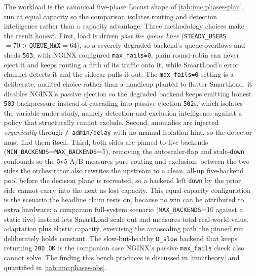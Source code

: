 The workload is the canonical five-phase Locust shape of \cref{tab:imc:phases-plan},
run at equal capacity so the comparison isolates routing and detection intelligence
rather than a capacity advantage. Three methodology choices make the result honest.
First, load is driven \emph{past the queue knee} (\texttt{STEADY\_USERS}$=70 >
\texttt{QUEUE\_MAX}=64$), so a severely degraded backend's queue overflows and sheds
\texttt{503}; with NGINX configured \texttt{max\_fails=0}, plain round-robin can never
eject it and keeps routing a fifth of its traffic onto it, while SmartLoad's error
channel detects it and the sidecar pulls it out. The \texttt{max\_fails=0} setting is a
deliberate, audited choice rather than a handicap planted to flatter SmartLoad: it
disables NGINX's passive ejection so the degraded backend keeps emitting honest
\texttt{503} backpressure instead of cascading into passive-ejection \texttt{502}s, which
isolates the variable under study, namely detection-and-exclusion intelligence against a
policy that structurally cannot exclude. Second, anomalies are injected
\emph{organically} through \texttt{/\_admin/delay} with no manual isolation hint, so the
detector must find them itself. Third, both sides are pinned to five backends
(\texttt{MIN\_BACKENDS}=\texttt{MAX\_BACKENDS}=5), removing the autoscaler-flap and
stale-\texttt{down} confounds so the 5v5 A/B measures pure routing and exclusion; between
the two sides the orchestrator also rewrites the upstream to a clean, all-up five-backend
pool before the decision plane is recreated, so a backend left \texttt{down} by the prior
side cannot carry into the next as lost capacity. This equal-capacity configuration is
the scenario the headline claim rests on, because no win can be attributed to extra
hardware; a companion full-system scenario (\texttt{MAX\_BACKENDS}=10 against a static
five) instead lets SmartLoad scale out and measures total real-world value, adaptation
plus elastic capacity, exercising the autoscaling path the pinned run deliberately holds
constant. The slow-but-healthy \texttt{D\_slow} backend that keeps returning
\texttt{200 OK} is the companion case NGINX's passive \texttt{max\_fails} check also
cannot solve. The finding this bench produces is discussed in \cref{imc:theory} and
quantified in \cref{tab:imc:phases-obs}.

